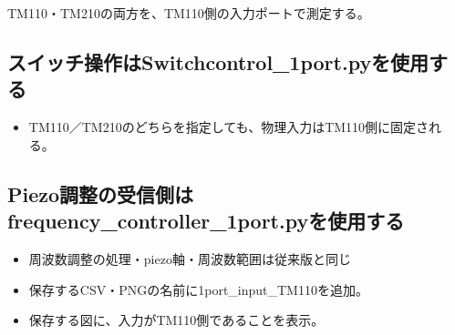 \documentclass[a4paper,11pt]{ltjsarticle}
\begin{document}
TM110・TM210の両方を、TM110側の入力ポートで測定する。


\subsection{スイッチ操作はSwitchcontrol\_1port.pyを使用する}

\begin{itemize}

\item TM110／TM210のどちらを指定しても、物理入力はTM110側に固定される。

\end{itemize}

\subsection{Piezo調整の受信側はfrequency\_controller\_1port.pyを使用する}

\begin{itemize}

\item 周波数調整の処理・piezo軸・周波数範囲は従来版と同じ

\item 保存するCSV・PNGの名前に1port\_input\_TM110を追加。

\item 保存する図に、入力がTM110側であることを表示。

\end{itemize}
\end{document}

